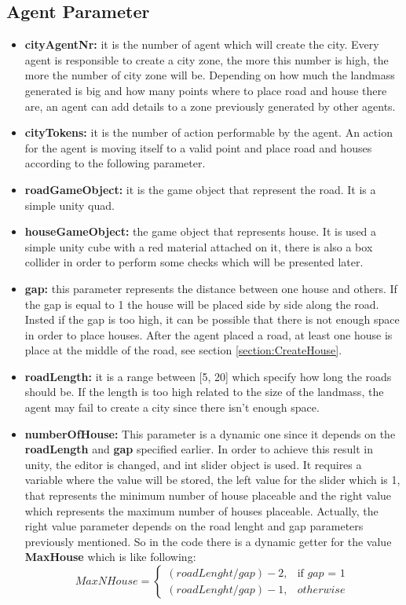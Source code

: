 \documentclass[12pt]{article}
\begin{document}
    \subsection{Agent Parameter}
    \begin{itemize}
        \item \textbf{cityAgentNr:} it is the number of agent which will create the city. Every agent is responsible to create a city zone, the more this 
        number is high, the more the number of city zone will be. Depending on how much the landmass generated is big and how many points where to place road
        and house there are, an agent can add details to a zone previously generated by other agents.
        \item \textbf{cityTokens:} it is the number of action performable by the agent. An action for the agent is moving itself to a valid point and place road 
        and houses according to the following parameter.
        \item \textbf{roadGameObject:} it is the game object that represent the road. It is a simple unity quad.
        \item \textbf{houseGameObject:} the game object that represents house. It is used a simple unity cube with a red material attached on it, there is also a box collider
        in order to perform some checks which will be presented later.
        \item \textbf{gap:} this parameter represents the distance between one house and others. If the gap is equal to 1 the house will be placed side by side
        along the road. Insted if the gap is too high, it can be possible that there is not enough space in order to place houses. After the agent placed a road,
        at least one house is place at the middle of the road, see section \ref{section:CreateHouse}. 
        \item \textbf{roadLength:} it is a range between [5, 20] which specify how long the roads should be. If the length is too high related to the size of the landmass,
        the agent may fail to create a city since there isn't enough space. 
        \item \textbf{numberOfHouse:} This parameter is a dynamic one since it depends on the \textbf{roadLength} and \textbf{gap} specified earlier. In order to achieve this result in unity,
        the editor is changed, and int slider object is used. It requires a variable where the value will be stored, the left value for the slider which is 1, that
        represents the minimum number of house placeable and the right value which represents the maximum number of houses placeable. Actually, the right value parameter depends on
        the road lenght and gap parameters previously mentioned. So in the code there is a dynamic getter for the value \textbf{MaxHouse} which is like following:
        \begin{equation}
            MaxNHouse = \begin{cases} (roadLenght/gap) - 2, & \mbox{if } gap\mbox{ = 1} \\ (roadLenght/gap) - 1, & \mbox{} otherwise\  \end{cases}
        \end{equation}


\end{itemize}
\end{document}
